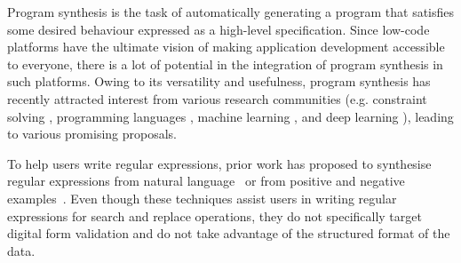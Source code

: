 Program synthesis is the task of automatically generating a program that satisfies some desired behaviour expressed as a high-level specification.
Since low-code platforms have the ultimate vision of making application development accessible to everyone, there is a lot of potential in the integration of program synthesis in such platforms.
Owing to its versatility and usefulness, program synthesis has recently attracted interest from various research communities (e.g.
constraint solving \cite{DBLP:conf/ijcai/KolbTPR18,Orvalho19,DBLP:journals/pacmpl/Yaghmazadeh0DD17,UnchartIt20,Regel20,DBLP:conf/tacas/AhmedPA20}, 
programming languages \cite{DBLP:conf/pldi/FengMBD18,DBLP:conf/pldi/FengMGDC17,DBLP:conf/pldi/WangCB17},
machine learning \cite{DBLP:conf/icml/MenonTGLK13,DBLP:conf/ijcai/EllisG17,DBLP:conf/cav/ChenWBDF20},
and deep learning \cite{DBLP:conf/iclr/BalogGBNT17,DBLP:conf/iclr/ParisottoMS0ZK17,DanielThesis,Regel20,DBLP:conf/naacl/HuangWSYH18}), leading to various promising proposals. %



To help users write regular expressions, prior work has proposed to synthesise regular expressions from natural language~\cite{Regel20,DBLP:conf/naacl/KushmanB13,DBLP:conf/emnlp/LocascioNDKB16,DBLP:conf/emnlp/ZhongGYPXLLZ18,DBLP:journals/pacmpl/Yaghmazadeh0DD17} or from positive and negative examples~\cite{Regel20,DBLP:conf/popl/Gulwani11,AlphaRegex16,Fidex16}. Even though these techniques assist users in writing regular expressions for search and replace operations, they do not specifically target digital form validation and do not take advantage of the structured format of the data.

